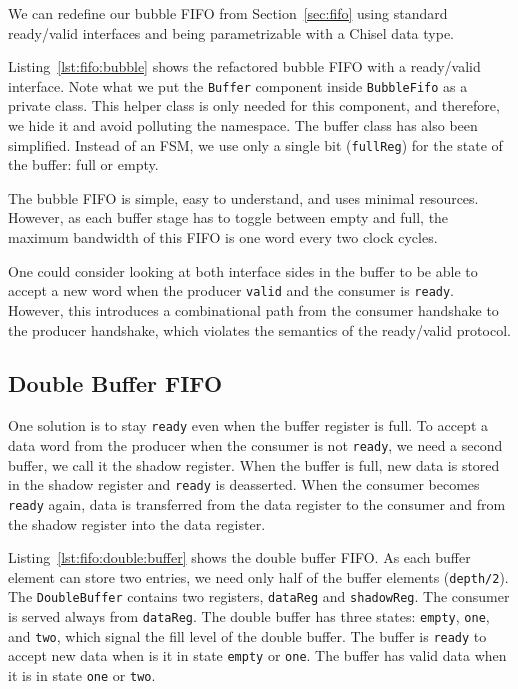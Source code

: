 \documentclass[%
    10pt,
    headinclude, footinclude=false,
    openright, %
    notitlepage,
    cleardoublepage=empty,
    headsepline,
    numbers=noenddot,
    bibliography=totoc, index=totoc,
    ]{scrbook}
\newcommand{\code}[1]{{\lstinline[basicstyle=\small\ttfamily]{#1}}}
\begin{document}
We can redefine our bubble FIFO from Section~\ref{sec:fifo} using standard
ready/valid interfaces and being parametrizable with a Chisel data type.


Listing~\ref{lst:fifo:bubble} shows the refactored bubble FIFO with a ready/valid
interface. Note what we put the \code{Buffer} component inside \code{BubbleFifo}
as a private class. This helper class is only needed for this component, and therefore,
we hide it and avoid polluting the namespace. The buffer class has also been
simplified. Instead of an FSM, we use only a single bit (\code{fullReg}) for
the state of the buffer: full or empty.

The bubble FIFO is simple, easy to understand, and uses minimal resources.
However, as each buffer stage has to toggle between empty and full, the maximum
bandwidth of this FIFO is one word every two clock cycles.

One could consider looking at both interface sides in the buffer to be able to accept
a new word when the producer \code{valid} and the consumer is \code{ready}.
However, this introduces a combinational path from the consumer handshake
to the producer handshake, which violates the semantics of the ready/valid protocol.

\subsection{Double Buffer FIFO}


One solution is to stay \code{ready} even when the buffer register is full.
To accept a data word from the producer when the consumer is not
\code{ready}, we need a second buffer, we call it the shadow register.
When the buffer is full, new data is stored in the shadow register and \code{ready}
is deasserted. When the consumer becomes \code{ready} again, data is transferred
from the data register to the consumer and from the shadow register into
the data register.

\newpage
{}


Listing~\ref{lst:fifo:double:buffer} shows the double buffer FIFO. As each buffer element
can store two entries, we need only half of the buffer elements (\code{depth/2}).
The \code{DoubleBuffer} contains two registers,
\code{dataReg} and \code{shadowReg}. The consumer is served always from
\code{dataReg}. The double buffer has three states: \code{empty}, \code{one},
and \code{two}, which signal the fill level of the double buffer.
The buffer is \code{ready} to accept new data when is it in state \code{empty}
or \code{one}. The buffer has valid data when it is in state \code{one} or \code{two}.
\end{document}
